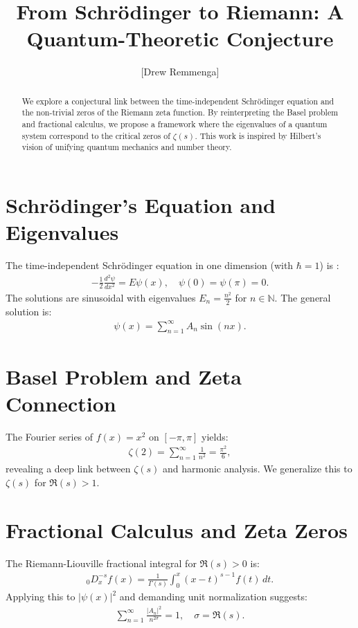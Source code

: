 \documentclass[10pt, oneside]{article}
\title{From Schrödinger to Riemann: A Quantum-Theoretic Conjecture}
\author{[Drew Remmenga]}
\newcommand{\N}{\mathbb{N}}
\begin{document}
\maketitle

\begin{abstract}
  We explore a conjectural link between the time-independent Schrödinger equation and the non-trivial zeros of the Riemann zeta function. By reinterpreting the Basel problem and fractional calculus, we propose a framework where the eigenvalues of a quantum system correspond to the critical zeros of $\zeta(s)$. This work is inspired by Hilbert's vision of unifying quantum mechanics and number theory.
\end{abstract}

\section{Schrödinger's Equation and Eigenvalues}
The time-independent Schrödinger equation in one dimension (with $\hbar = 1$) is \cite{Islam1994}:
\begin{align}
  -\frac{1}{2} \frac{d^2 \psi}{dx^2} = E \psi(x), \quad \psi(0) = \psi(\pi) = 0. \label{schrodinger}
\end{align}
The solutions are sinusoidal with eigenvalues $E_n = \frac{n^2}{2}$ for $n \in \N$. The general solution is:
\begin{align}
  \psi(x) = \sum_{n=1}^\infty A_n \sin(nx). \label{eq:wave}
\end{align}

\section{Basel Problem and Zeta Connection}
The Fourier series of $f(x) = x^2$ on $[-\pi, \pi]$ yields:
\begin{align}
  \zeta(2) = \sum_{n=1}^\infty \frac{1}{n^2} = \frac{\pi^2}{6}, \label{eq:basel}
\end{align}
revealing a deep link between $\zeta(s)$ and harmonic analysis. We generalize this to $\zeta(s)$ for $\Re(s) > 1$.

\section{Fractional Calculus and Zeta Zeros}
The Riemann-Liouville fractional integral for $\Re(s) > 0$ is:
\begin{align}
  _0D_x^{-s} f(x) = \frac{1}{\Gamma(s)} \int_0^x (x-t)^{s-1} f(t) \, dt. \label{Riemann-Liouville}
\end{align}
Applying this to $|\psi(x)|^2$ and demanding unit normalization suggests:
\begin{align}
  \sum_{n=1}^\infty \frac{|A_n|^2}{n^{2\sigma}} = 1, \quad \sigma = \Re(s). \label{eq:norm}
\end{align}
\end{document}

